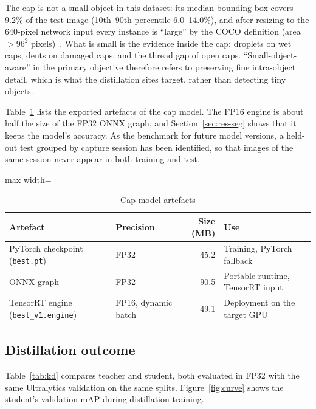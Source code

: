 The cap is not a small object in this dataset: its median bounding box covers 9.2\% of the test image (10th--90th percentile 6.0--14.0\%), and after resizing to the 640-pixel network input every instance is ``large'' by the COCO definition (area $>96^2$ pixels)~\cite{lin2014coco}. What is small is the evidence inside the cap: droplets on wet caps, dents on damaged caps, and the thread gap of open caps. ``Small-object-aware'' in the primary objective therefore refers to preserving fine intra-object detail, which is what the distillation sites target, rather than detecting tiny objects.

Table~\ref{tab:artefacts} lists the exported artefacts of the cap model. The FP16 engine is about half the size of the FP32 ONNX graph, and Section~\ref{sec:res-seg} shows that it keeps the model's accuracy. As the benchmark for future model versions, a held-out test grouped by capture session has been identified, so that images of the same session never appear in both training and test.

\begin{table}[htbp]
\centering
\caption{Cap model artefacts}
\label{tab:artefacts}
\begin{adjustbox}{max width=\textwidth}
\begin{tabular}{|l|l|r|l|}
\hline
\textbf{Artefact} & \textbf{Precision} & \textbf{Size (MB)} & \textbf{Use} \\ \hline
PyTorch checkpoint (\texttt{best.pt}) & FP32 & 45.2 & Training, PyTorch fallback \\ \hline
ONNX graph & FP32 & 90.5 & Portable runtime, TensorRT input \\ \hline
TensorRT engine (\texttt{best\_v1.engine}) & FP16, dynamic batch & 49.1 & Deployment on the target GPU \\ \hline
\end{tabular}
\end{adjustbox}
\end{table}

\subsection{Distillation outcome}
\label{sec:res-kd}
Table~\ref{tab:kd} compares teacher and student, both evaluated in FP32 with the same Ultralytics validation on the same splits. Figure~\ref{fig:curve} shows the student's validation mAP during distillation training.

